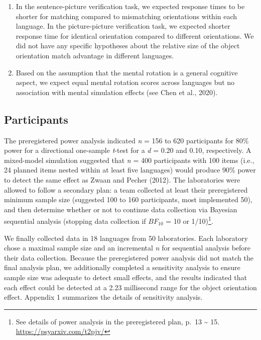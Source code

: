 \documentclass[
  man]{apa7}
\begin{document}
\begin{enumerate}
\def\labelenumi{(\arabic{enumi})}
\item
  In the sentence-picture verification task, we expected response times to be shorter for matching compared to mismatching orientations within each language. In the picture-picture verification task, we expected shorter response time for identical orientation compared to different orientations. We did not have any specific hypotheses about the relative size of the object orientation match advantage in different languages.
\item
  Based on the assumption that the mental rotation is a general cognitive aspect, we expect equal mental rotation scores across languages but no association with mental simulation effects (see Chen et al., 2020).
\end{enumerate}

\hypertarget{participants}{%
\subsection{Participants}\label{participants}}

The preregistered power analysis indicated \emph{n} = 156 to 620 participants for 80\% power for a directional one-sample \emph{t}-test for a \emph{d} = 0.20 and 0.10, respectively. A mixed-model simulation suggested that \emph{n} = 400 participants with 100 items (i.e., 24 planned items nested within at least five languages) would produce 90\% power to detect the same effect as Zwaan and Pecher (2012). The laboratories were allowed to follow a secondary plan: a team collected at least their preregistered minimum sample size (suggested 100 to 160 participants, most implemented 50), and then determine whether or not to continue data collection via Bayesian sequential analysis (stopping data collection if \(BF_{10}\) = 10 or 1/10)\footnote{See details of power analysis in the preregistered plan, p.~13 \textasciitilde{} 15. \url{https://psyarxiv.com/t2pjv/}}.

We finally collected data in 18 languages from 50 laboratories. Each laboratory chose a maximal sample size and an incremental \emph{n} for sequential analysis before their data collection. Because the preregistered power analysis did not match the final analysis plan, we additionally completed a sensitivity analysis to ensure sample size was adequate to detect small effects, and the results indicated that each effect could be detected at a 2.23 millisecond range for the object orientation effect. Appendix 1 summarizes the details of sensitivity analysis.
\end{document}
